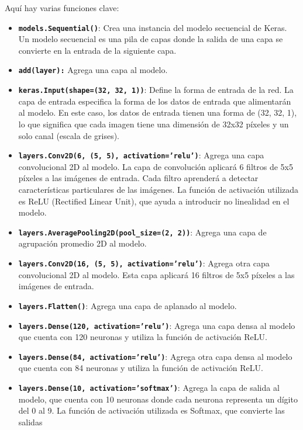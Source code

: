 Aquí hay varias funciones clave:

\begin{itemize}
    \item \textbf{\texttt{models.Sequential()}}: Crea una instancia del modelo secuencial de Keras. 
    Un modelo secuencial es una pila de capas donde la salida de una capa se convierte en la entrada de la siguiente capa.  
    \item \textbf{\texttt{add(layer):}} Agrega una capa al modelo.
    \item \textbf{\texttt{keras.Input(shape=(32, 32, 1))}}: Define la forma de entrada de la red. 
    La capa de entrada especifica la forma de los datos de entrada que alimentarán al modelo. 
    En este caso, los datos de entrada tienen una forma de (32, 32, 1), lo que significa que cada imagen 
    tiene una dimensión de 32x32 píxeles y un solo canal (escala de grises).
    \item \textbf{\texttt{layers.Conv2D(6, (5, 5), activation='relu')}}: Agrega una capa convolucional 2D al modelo.
    La capa de convolución aplicará 6 filtros de 5x5 píxeles a las imágenes de entrada. 
    Cada filtro aprenderá a detectar características particulares de las imágenes. 
    La función de activación utilizada es ReLU (Rectified Linear Unit), que ayuda a introducir no linealidad en el modelo.
    \item \textbf{\texttt{layers.AveragePooling2D(pool\_size=(2, 2))}}: Agrega una capa de agrupación promedio 2D al modelo.
    \item \textbf{\texttt{layers.Conv2D(16, (5, 5), activation='relu')}}: Agrega otra capa convolucional 2D al modelo.
    Esta capa aplicará 16 filtros de 5x5 píxeles a las imágenes de entrada.
    \item \textbf{\texttt{layers.Flatten()}}: Agrega una capa de aplanado al modelo.
    \item \textbf{\texttt{layers.Dense(120, activation='relu')}}: Agrega una capa densa al modelo que cuenta con 120 neuronas
    y utiliza la función de activación ReLU.
    \item \textbf{\texttt{layers.Dense(84, activation='relu')}}: Agrega otra capa densa al modelo que cuenta con 84 neuronas
    y utiliza la función de activación ReLU.
    \item \textbf{\texttt{layers.Dense(10, activation='softmax')}}: Agrega la capa de salida al modelo, que cuenta con 10 neuronas
    donde cada neurona representa un dígito del 0 al 9. La función de activación utilizada es Softmax, que convierte las salidas

\end{itemize}
